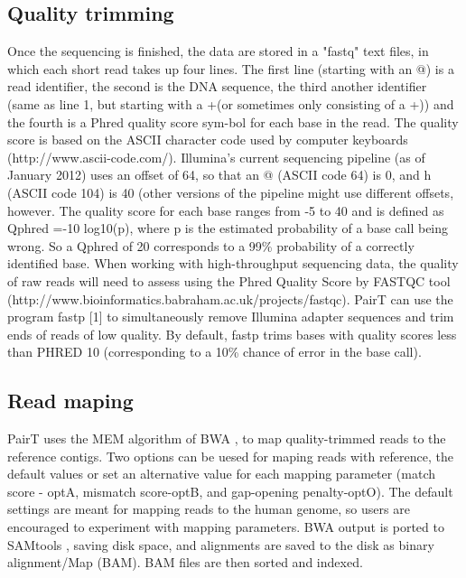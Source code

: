 \documentclass[conference]{IEEEtran}
\begin{document}
\subsection{Quality trimming}
Once the sequencing is finished, the data are stored in a "fastq" text files, in which each short read takes up four lines. The first line (starting with an @) is a read identifier, the second is the DNA sequence, the third another identifier (same as line 1, but starting with a +(or sometimes only consisting of a +)) and the fourth is a Phred quality score sym-bol for each base in the read. The quality score is based on the ASCII character code used by computer keyboards (http://www.ascii-code.com/). Illumina's current sequencing pipeline (as of January 2012) uses an offset of 64, so that an @ (ASCII code 64) is 0, and h (ASCII code 104) is 40 (other versions of the pipeline might use different offsets, however. The quality score for each base ranges from -5 to 40 and is defined as Qphred =-10 log10(p), where p is the estimated probability of a base call being wrong. So a Qphred of 20 corresponds to a 99\% probability of a correctly identified base. When working with high-throughput sequencing data, the quality of raw reads will need to assess using the Phred Quality Score by FASTQC tool (http://www.bioinformatics.babraham.ac.uk/projects/fastqc). PairT can use the program fastp [1] to simultaneously remove Illumina adapter sequences and trim ends of reads of low quality. By default, fastp trims bases with quality scores less than PHRED 10 (corresponding to a 10\% chance of error in the base call).

\subsection{Read maping}
PairT uses the MEM algorithm \cite{Li2013} of BWA \cite{Li2010},\cite{Li2009} to map quality-trimmed reads to the reference contigs. Two options can be uesed for maping reads with reference, the default values or set an alternative value for each mapping parameter (match score - optA, mismatch score-optB, and gap-opening penalty-optO). The default settings are meant for mapping reads to the human genome, so users are encouraged to experiment with mapping parameters. BWA output is ported to SAMtools \cite{Li2009a}, saving disk space, and alignments are saved to the disk as binary alignment/Map (BAM). BAM files are then sorted and indexed.
\end{document}

